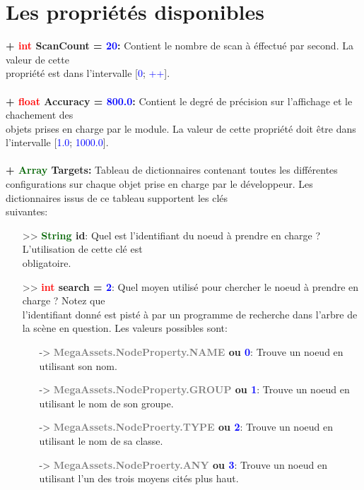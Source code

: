 \documentclass[a4paper, 11pt]{article}
\begin{document}
	\section{Les propriétés disponibles}
	\textbf{+ \textcolor{red}{int} ScanCount = \textcolor{blue}{20}:} Contient le nombre de scan à éffectué 
	par second. La valeur de cette \\propriété est dans l'intervalle [\textcolor{blue}{0}; \textcolor{blue}
	{++}].\\\\
	\textbf{+ \textcolor{red}{float} Accuracy = \textcolor{blue}{800.0}:} Contient le degré de précision sur 
	l'affichage et le chachement des \\objets prises en charge par le module. La valeur de cette propriété 
	doit être dans l'intervalle [\textcolor{blue}{1.0}; \textcolor{blue}{1000.0}].\\\\
	\textbf{+ \textcolor{darkgreen}{Array} Targets:} Tableau de dictionnaires contenant toutes les 
	différentes configurations sur chaque objet prise en charge par le développeur. Les dictionnaires issus 
	de ce tableau supportent les clés \\suivantes:\\
	\begin{itemize}
		\item[>> \textbf{\textcolor{darkgreen}{String} id}:] Quel est l'identifiant du noeud à prendre en 
		charge ? L'utilisation de cette clé est \\obligatoire.\\
		\item[>> \textbf{\textcolor{red}{int} search = \textcolor{blue}{2}}:] Quel moyen utilisé pour 
		chercher le noeud à prendre en charge ? Notez que \\l'identifiant donné est pisté à par un programme 
		de recherche dans l'arbre de la scène en question. Les valeurs possibles sont:
		\begin{itemize}
			\item [-> \textbf{\textcolor{gray}{MegaAssets.NodeProperty.NAME} ou \textcolor{blue}{0}}:] 
			Trouve un noeud en utilisant son nom.
			\item [-> \textbf{\textcolor{gray}{MegaAssets.NodeProperty.GROUP} ou \textcolor{blue}{1}}:] 
			Trouve un noeud en utilisant le nom de son groupe.
			\item [-> \textbf{\textcolor{gray}{MegaAssets.NodeProerty.TYPE} ou \textcolor{blue}{2}}:] Trouve 
			un noeud en utilisant le nom de sa classe.
			\item [-> \textbf{\textcolor{gray}{MegaAssets.NodeProerty.ANY} ou \textcolor{blue}{3}}:] Trouve 
			un noeud en utilisant l'un des trois moyens cités plus haut.
		\end{itemize}
	\end{itemize}
\end{document}
